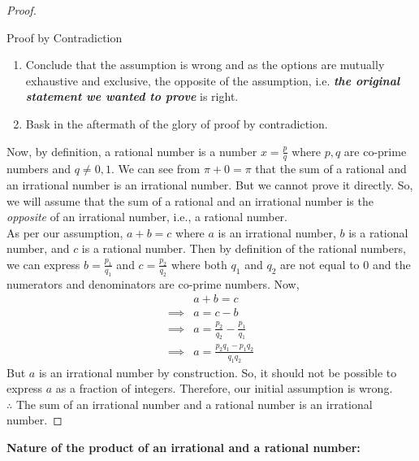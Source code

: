\begin{proof}
\begin{Trick}{Proof by Contradiction}
\begin{enumerate}
            \item Conclude that the assumption is wrong and as the options are mutually exhaustive and exclusive, the opposite of the assumption, i.e. \textbf{\textit{the original statement we wanted to prove}} is right.
            \item Bask in the aftermath of the glory of proof by contradiction.
        \end{enumerate}
    \end{Trick}
    \noindent Now, by definition, a rational number is a number $x=\frac{p}{q}$ where $p,q$ are co-prime numbers and $q\neq 0,1$. We can see from $\pi+0=\pi$ that the sum of a rational and an irrational number is an irrational number. But we cannot prove it directly. So, we will assume that the sum of a rational and an irrational number is the \textit{opposite} of an irrational number, i.e., a rational number.\\
    As per our assumption, $a+b=c$ where $a$ is an irrational number, $b$ is a rational number, and $c$ is a rational number. Then by definition of the rational numbers, we can express $b=\frac{p_1}{q_1}$ and $c=\frac{p_2}{q_2}$ where both $q_1$ and $q_2$ are not equal to $0$ and the numerators and denominators are co-prime numbers. Now,
    \begin{align*}
        &a+b=c\\
        \implies&a=c-b\\
        \implies&a=\frac{p_2}{q_2}-\frac{p_1}{q_1}\\
        \implies&a=\frac{p_2 q_1-p_1 q_2}{q_1 q_2}
    \end{align*}
    But $a$ is an irrational number by construction. So, it should not be possible to express $a$ as a fraction of integers. Therefore, our initial assumption is wrong.\\
    $\therefore$ The sum of an irrational number and a rational number is an irrational number.
\end{proof}
\noindent\textbf{Nature of the product of an irrational and a rational number:}
